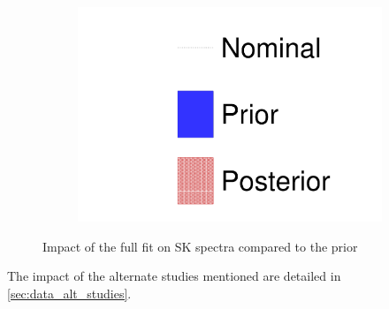 \begin{figure}[h]
\begin{subfigure}[t]{0.32\textwidth}
		\includegraphics[width=\textwidth, trim={0mm 0mm 0mm 0mm}, clip, page=4]{figures/mach3/data/prior_error_1june_try_2017_fit_on_sk_spectra}
	\end{subfigure}
	
	\caption{Impact of the full fit on SK spectra compared to the prior}
	\label{fig:sk_2017}
\end{figure}

The impact of the alternate studies mentioned are detailed in \autoref{sec:data_alt_studies}.
